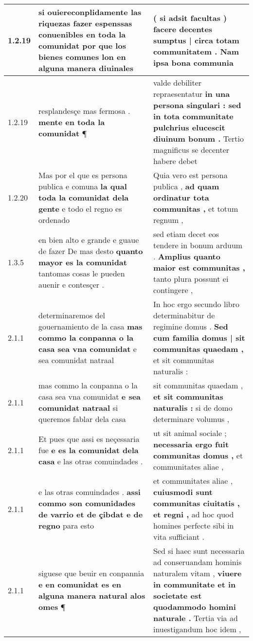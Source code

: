 \begin{tabular}{|p{1cm}|p{6.5cm}|p{6.5cm}|}

\hline
1.2.19 & si \textbf{ ouiereconplidamente las riquezas fazer espenssas conuenibles en toda la comunidat } por que los bienes comunes lon en alguna manera diuinales & ( si adsit facultas ) \textbf{ facere decentes sumptus | circa totam communitatem . } Nam ipsa bona communia \\\hline
1.2.19 & resplandesçe mas fermosa . \textbf{ mente en toda la comunidat } ¶ & valde debiliter repraesentatur \textbf{ in una persona singulari : sed in tota communitate pulchrius elucescit diuinum bonum . } Tertio magnificus se decenter habere debet \\\hline
1.2.20 & Mas por el que es persona publica e comuna \textbf{ la qual toda la comunidat dela gente } e todo el regno es ordenado & Quia vero est persona publica , \textbf{ ad quam ordinatur tota communitas , } et totum regnum , \\\hline
1.3.5 & en bien alto e grande e guaue de fazer De mas desto \textbf{ quanto mayor es la comunidat } tantomas cosas le pueden auenir e contesçer . & sed etiam decet eos tendere in bonum arduum . \textbf{ Amplius quanto maior est communitas , } tanto plura possunt ei contingere , \\\hline
2.1.1 & determinaremos del gouernamiento de la casa \textbf{ mas commo la conpanna o la casa sea vna comunidat } e sea comunidat natraal & In hoc ergo secundo libro determinabitur de regimine domus . \textbf{ Sed cum familia domus | sit communitas quaedam , } et sit communitas naturalis : \\\hline
2.1.1 & mas commo la conpanna o la casa sea vna comunidat \textbf{ e sea comunidat natraal } si queremos fablar dela casa & sit communitas quaedam , \textbf{ et sit communitas naturalis : } si de domo determinare volumus , \\\hline
2.1.1 & Et pues que assi es neçessaria fue \textbf{ e es la comunidat dela casa } e las otras comuindades . & ut sit animal sociale ; \textbf{ necessaria ergo fuit communitas domus , } et communitates aliae , \\\hline
2.1.1 & e las otras comuindades . \textbf{ assi commo son comunidades de varrio et de çibdat e de regno } para esto & et communitates aliae , \textbf{ cuiusmodi sunt communitas ciuitatis , et regni , } ad hoc quod homines perfecte sibi in vita sufficiant . \\\hline
2.1.1 & siguese que beuir en conpannia \textbf{ e en comunidat es en alguna manera natural alos omes } ¶ & Sed si haec sunt necessaria ad conseruandam hominis naturalem vitam , \textbf{ viuere in communitate et in societate est quodammodo homini naturale . } Tertia via ad inuestigandum hoc idem , \\\hline

\end{tabular}
